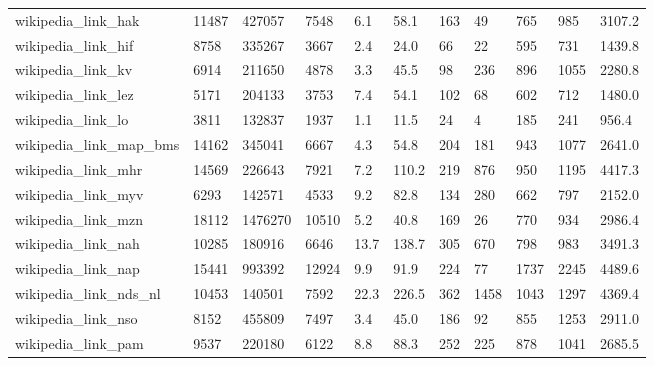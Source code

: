 \begin{longtable}{lllllllllll}
 wikipedia\_link\_hak                                 & 11487      & 427057    & 7548  & 6.1    & 58.1   & 163   & 49     & 765    & 985    & 3107.2  \\
 wikipedia\_link\_hif                                 & 8758       & 335267    & 3667  & 2.4    & 24.0   & 66    & 22     & 595    & 731    & 1439.8  \\
 wikipedia\_link\_kv                                  & 6914       & 211650    & 4878  & 3.3    & 45.5   & 98    & 236    & 896    & 1055   & 2280.8  \\
 wikipedia\_link\_lez                                 & 5171       & 204133    & 3753  & 7.4    & 54.1   & 102   & 68     & 602    & 712    & 1480.0  \\
 wikipedia\_link\_lo                                  & 3811       & 132837    & 1937  & 1.1    & 11.5   & 24    & 4      & 185    & 241    & 956.4   \\
 wikipedia\_link\_map\_bms                             & 14162      & 345041    & 6667  & 4.3    & 54.8   & 204   & 181    & 943    & 1077   & 2641.0  \\
 wikipedia\_link\_mhr                                 & 14569      & 226643    & 7921  & 7.2    & 110.2  & 219   & 876    & 950    & 1195   & 4417.3  \\
 wikipedia\_link\_myv                                 & 6293       & 142571    & 4533  & 9.2    & 82.8   & 134   & 280    & 662    & 797    & 2152.0  \\
 wikipedia\_link\_mzn                                 & 18112      & 1476270   & 10510 & 5.2    & 40.8   & 169   & 26     & 770    & 934    & 2986.4  \\
 wikipedia\_link\_nah                                 & 10285      & 180916    & 6646  & 13.7   & 138.7  & 305   & 670    & 798    & 983    & 3491.3  \\
 wikipedia\_link\_nap                                 & 15441      & 993392    & 12924 & 9.9    & 91.9   & 224   & 77     & 1737   & 2245   & 4489.6  \\
 wikipedia\_link\_nds\_nl                              & 10453      & 140501    & 7592  & 22.3   & 226.5  & 362   & 1458   & 1043   & 1297   & 4369.4  \\
 wikipedia\_link\_nso                                 & 8152       & 455809    & 7497  & 3.4    & 45.0   & 186   & 92     & 855    & 1253   & 2911.0  \\
 wikipedia\_link\_pam                                 & 9537       & 220180    & 6122  & 8.8    & 88.3   & 252   & 225    & 878    & 1041   & 2685.5  \\

\end{longtable}
